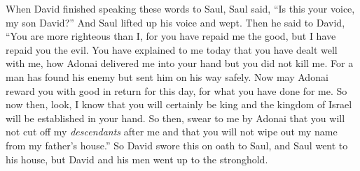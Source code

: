 \begin{biblechapter}
\verse When David finished speaking these words to Saul, Saul said, “Is this your voice, my son David?” And Saul lifted up his voice and wept.
\verse Then he said to David, “You are more righteous than I, for you have repaid me the good, but I have repaid you the evil.
\verse You have explained to me today that you have dealt well with me, how Adonai delivered me into your hand but you did not kill me.
\verse For a man has found his enemy but sent him on his way safely. Now may Adonai reward you with good in return for this day, for what you have done for me.
\verse So now then, look, I know that you will certainly be king and the kingdom of Israel will be established in your hand.
\verse So then, swear to me by Adonai that you will not cut off my \textit{descendants} after me and that you will not wipe out my name from my father’s house.”
\verse So David swore this on oath to Saul, and Saul went to his house, but David and his men went up to the stronghold.
\end{biblechapter}

